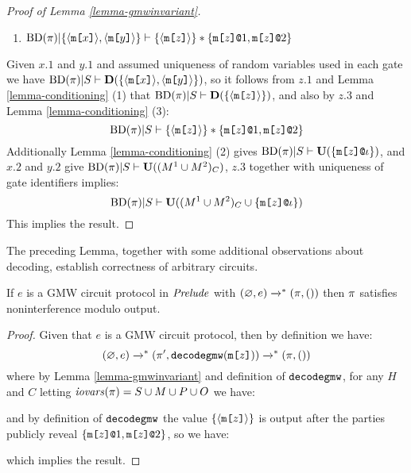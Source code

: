 \begin{proof}[Proof of Lemma \ref{lemma-gmwinvariant}]
\begin{enumerate}[\hspace{5mm}(z.1)]
  \item $\condsep
    {\progtt(\prog)}
    {\{ \macgv{\mesg{x}},\macgv{\mesg{y}} \}}
    {\{ \macgv{\mesg{z}} \}}
    {\{ \elab{\mesg{z}}{1},\elab{\mesg{z}}{2} \}}$
  \end{enumerate}
  Given $x.1$ and $y.1$ and assumed uniqueness of random variables
  used in each gate we have $\conddetx{\progtt(\prog)}{S}{\{
    \macgv{\mesg{x}},\macgv{\mesg{y}}\}}$, so it follows from $z.1$
  and Lemma \ref{lemma-conditioning} (1) that
  $\conddetx{\progtt(\prog)}{S}{\{\macgv{\mesg{z}}\}}$, and also by
  $z.3$ and Lemma \ref{lemma-conditioning} (3):
  $$\condsep
  {\progtt(\prog)}
  {S}
  {\{ \macgv{\mesg{z}} \}}
  {\{ \elab{\mesg{z}}{1},\elab{\mesg{z}}{2} \}}$$
  Additionally Lemma \ref{lemma-conditioning} (2) gives $\condunix{\progtt(\prog)}{S}{\{ \elab{\mesg{z}}{\cid} \}}$,
  and $x.2$ and $y.2$ give $\condunix{\progtt(\prog)}{S}{(M^1 \cup M^2)_C}$, $z.3$ together with
  uniqueness of gate identifiers implies:
  $$
  \condunix{\progtt(\prog)}{S}{(M^1 \cup M^2)_C \cup \{  \elab{\mesg{z}}{\cid} \}}
  $$
  This implies the result.
\end{proof}
The preceding Lemma, together with some additional observations about decoding, establish correctness
of arbitrary circuits. 
\begin{theorem}
  \label{theorem-gmw}
  If $e$ is a GMW circuit protocol in $\metaprot$ with $(\varnothing,e) \redxs (\prog,())$
  then $\prog$ satisfies noninterference modulo output. 
\end{theorem}

\begin{proof}
  Given that $e$ is a GMW circuit protocol, then by definition we have:
  $$
  (\varnothing,e) \redxs (\prog',\decodegmw(\mesg{z})) \redxs (\prog,())
  $$
  where by Lemma \ref{lemma-gmwinvariant} and definition of $\decodegmw$,
  for any $H$ and $C$ letting $\iov(\prog) = S \cup M \cup P \cup O$ we
  have:
  \begin{mathpar}
  \end{mathpar}
  and by definition of $\decodegmw$ the value $\{\macgv{\mesg{z}}\}$ is output
  after the parties publicly reveal $\{ \elab{\mesg{z}}{1}, \elab{\mesg{z}}{2} \}$, so we have:
  \begin{mathpar} 
    
  \end{mathpar}
  which implies the result.
\end{proof}

